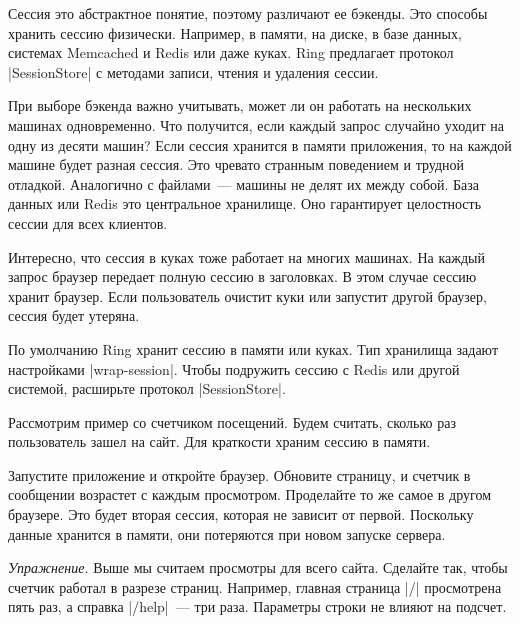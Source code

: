 Сессия это абстрактное понятие, поэтому различают ее бэкенды. Это способы
хранить сессию физически. Например, в памяти, на диске, в базе данных, системах
Memcached и Redis или даже куках. Ring предлагает протокол \spverb|SessionStore|
с методами записи, чтения и удаления сессии.

При выборе бэкенда важно учитывать, может ли он работать на нескольких машинах
одновременно. Что получится, если каждый запрос случайно уходит на одну из
десяти машин? Если сессия хранится в памяти приложения, то на каждой машине
будет разная сессия. Это чревато странным поведением и трудной
отладкой. Аналогично с файлами~--- машины не делят их между собой. База данных
или Redis это центральное хранилище. Оно гарантирует целостность сессии для всех
клиентов.

Интересно, что сессия в куках тоже работает на многих машинах. На каждый запрос
браузер передает полную сессию в заголовках. В этом случае сессию хранит
браузер. Если пользователь очистит куки или запустит другой браузер, сессия
будет утеряна.

По умолчанию Ring хранит сессию в памяти или куках. Тип хранилища задают
настройками \spverb|wrap-session|. Чтобы подружить сессию с Redis или другой
системой, расширьте протокол \spverb|SessionStore|.

Рассмотрим пример со счетчиком посещений. Будем считать, сколько раз
пользователь зашел на сайт. Для краткости храним сессию в памяти.

\begin{english}
\end{english}

Запустите приложение и откройте браузер. Обновите страницу, и счетчик в
сообщении возрастет с каждым просмотром. Проделайте то же самое в другом
браузере. Это будет вторая сессия, которая не зависит от первой. Поскольку
данные хранится в памяти, они потеряются при новом запуске сервера.

\emph{Упражнение.} Выше мы считаем просмотры для всего сайта. Сделайте так,
чтобы счетчик работал в разрезе страниц. Например, главная страница \spverb|/|
просмотрена пять раз, а справка \spverb|/help|~--- три раза. Параметры строки не
влияют на подсчет.


